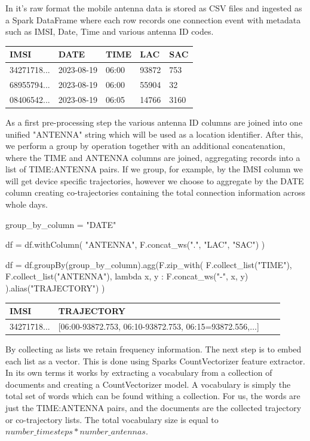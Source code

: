 \documentclass[../main.tex]{subfiles}
\begin{document}
In it's raw format the mobile antenna data is stored as CSV files and ingested as a Spark DataFrame where each row records one connection event with metadata such as IMSI, Date, Time and various antenna ID codes.

\begin{table}[H]
\centering
\begin{tabular}{|l|l|l|l|l|}
\hline
IMSI & DATE & TIME & LAC & SAC \\ \hline
34271718... & 2023-08-19 & 06:00 & 93872 & 753 \\ \hline
68955794... & 2023-08-19 & 06:00 & 55904 & 32 \\ \hline
08406542... & 2023-08-19 & 06:05 & 14766 & 3160 \\ \hline
\end{tabular}
\end{table}

As a first pre-processing step the various antenna ID columns are joined into one unified "ANTENNA" string which will be used as a location identifier. After this, we perform a group by operation together with an additional concatenation, where the TIME and ANTENNA columns are joined, aggregating records into a list of TIME:ANTENNA pairs. If we group, for example, by the IMSI column we will get device specific trajectories, however we choose to aggregate by the DATE column creating co-trajectories containing the total connection information across whole days.

\begin{python}
group_by_column = "DATE"

df = df.withColumn(
        "ANTENNA",
        F.concat_ws(".", "LAC", "SAC")
    )
    
df = df.groupBy(group_by_column).agg(F.zip_with(
        F.collect_list("TIME"),
        F.collect_list("ANTENNA"),
        lambda x, y : F.concat_ws("-", x, y)
    ).alias("TRAJECTORY")
)
\end{python}

\begin{table}[H]
\centering
\begin{tabular}{|l|l|l|l|}
\hline
IMSI & TRAJECTORY \\ \hline
34271718... & [06:00-93872.753, 06:10-93872.753, 06:15=93872.556,$\ldots$] \\ \hline
\end{tabular}
\end{table}

By collecting as lists we retain frequency information. The next step is to embed each list as a vector. This is done using Sparks CountVectorizer feature extractor. In its own terms it works by extracting a vocabulary from a collection of documents and creating a CountVectorizer model. A vocabulary is simply the total set of words which can be found withing a collection. For us, the words are just the TIME:ANTENNA pairs, and the documents are the collected trajectory or co-trajectory lists. The total vocabulary size is equal to $number\_timesteps *  number\_antennas$.
\end{document}
